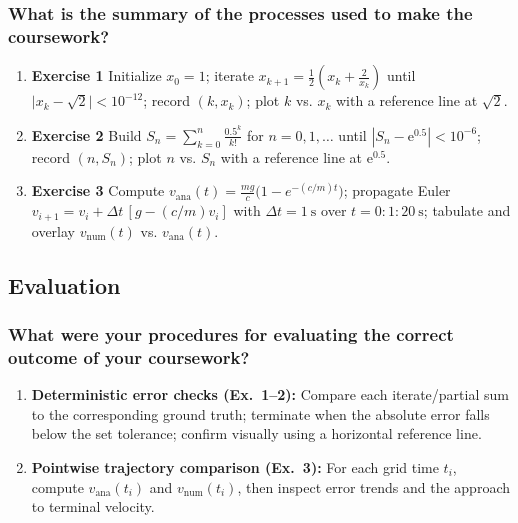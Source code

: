 \subsubsection{What is the summary of the processes used to make the coursework?}
\begin{enumerate}
  \item \textbf{Exercise 1} Initialize \(x_0=1\); iterate
  \(x_{k+1}=\tfrac12\!\left(x_k+\tfrac{2}{x_k}\right)\) until
  \(\bigl|x_k-\sqrt{2}\bigr|<10^{-12}\); record \((k,x_k)\); plot \(k\) vs. \(x_k\) with a reference line at \(\sqrt{2}\).
  \item \textbf{Exercise 2} Build \(S_n=\sum_{k=0}^{n}\tfrac{0.5^{k}}{k!}\)
  for \(n=0,1,\dots\) until \(|S_n-\mathrm{e}^{0.5}|<10^{-6}\); record \((n,S_n)\); plot \(n\) vs. \(S_n\) with
  a reference line at \(\mathrm{e}^{0.5}\).
  \item \textbf{Exercise 3} Compute
  \(v_{\mathrm{ana}}(t)=\tfrac{mg}{c}\bigl(1-e^{-(c/m)t}\bigr)\); propagate Euler
  \(v_{i+1}=v_i+\Delta t\,[g-(c/m)v_i]\) with \(\Delta t=1~\mathrm{s}\) over \(t=0{:}1{:}20~\mathrm{s}\);
  tabulate and overlay \(v_{\mathrm{num}}(t)\) vs. \(v_{\mathrm{ana}}(t)\).
\end{enumerate}

\subsection{Evaluation}
\label{sec:eval}

\subsubsection{What were your procedures for evaluating the correct outcome of your coursework?}
\begin{enumerate}
  \item \textbf{Deterministic error checks (Ex.~1–2):} Compare each iterate/partial sum to the
  corresponding ground truth; terminate when the absolute error falls below the set tolerance;
  confirm visually using a horizontal reference line.
  \item \textbf{Pointwise trajectory comparison (Ex.~3):} For each grid time \(t_i\), compute
  \(v_{\mathrm{ana}}(t_i)\) and \(v_{\mathrm{num}}(t_i)\), then inspect error trends and the approach to
  terminal velocity.
\end{enumerate}
	
